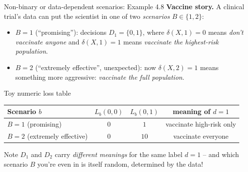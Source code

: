\documentclass[aspectratio=169,10pt]{beamer}
\begin{document}
\begin{frame}{Non-binary or data-dependent scenarios: Example 4.8}
  \textbf{Vaccine story.} A clinical trial's data can put the scientist in
  one of two \emph{scenarios} $B\in\{1,2\}$:
  \begin{itemize}
    \item $B=1$ (``promising''): decisions $D_1=\{0,1\}$, where
    $\delta(X,1)=0$ means \emph{don't vaccinate anyone} and $\delta(X,1)=1$
    means \emph{vaccinate the highest-risk population}.
    \item $B=2$ (``extremely effective'', unexpected): now
    $\delta(X,2)=1$ means something more aggressive: \emph{vaccinate the
    full population}.
  \end{itemize}
  \begin{block}{Toy numeric loss table}
    \begin{center}
    \begin{tabular}{lccc}
      \toprule
      Scenario $b$ & $L_b(0,0)$ & $L_b(0,1)$ & meaning of $d=1$\\
      \midrule
      $B=1$ (promising) & $0$ & $1$ & vaccinate high-risk only\\
      $B=2$ (extremely effective) & $0$ & $10$ & vaccinate everyone\\
      \bottomrule
    \end{tabular}
    \end{center}
  \end{block}
  Note $D_1$ and $D_2$ carry \emph{different meanings} for the same label
  $d=1$ -- and which scenario $B$ you're even in is itself random,
  determined by the data!
\end{frame}
\end{document}
